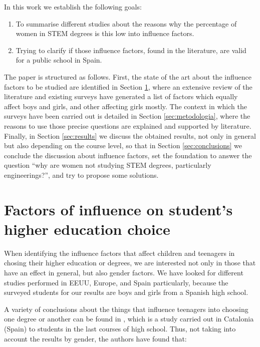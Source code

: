 \documentclass[journal,transmag]{IEEEtran}
\begin{document}
\begin{itemize}
\end{itemize}

In this work we establish the following goals:
\begin{enumerate}
	\item To summarise different studies about the reasons why the percentage of women in STEM degrees is this low into influence factors.
	\item Trying to clarify if those influence factors, found in the literature, are valid for a public school in Spain.
\end{enumerate}

The paper is structured as follows. First, the state of the art about the influence factors to be studied are identified in Section \ref{sec:factores}, where an extensive review of the literature and existing surveys have generated a list of factors which equally affect boys and girls, and other affecting girls mostly. The context in which the surveys have been carried out is detailed in Section \ref{sec:metodologia}, where the reasons to use those precise questions are explained and supported by literature. Finally, in Section \ref{sec:results} we discuss the obtained results, not only in general but also depending on the course level, so that in Section \ref{sec:conclusions} we conclude the discussion about influence factors, set the foundation to answer the question ``why are women not studying STEM degrees, particularly engineerings?'', and try to propose some solutions.

\section{Factors of influence on student's higher education choice}
\label{sec:factores}

When identifying the influence factors that affect children and teenagers in chosing their higher education or degrees, we are interested not only in those that have an effect in general, but also gender factors. We have looked for different studies performed in EEUU, Europe, and Spain particularly, because the surveyed students for our results are boys and girls from a Spanish high school.

A variety of conclusions about the things that influence teenagers into choosing one degree or another can be found in \cite{everis2012}, which is a study carried out in Catalonia (Spain) to students in the last courses of high school. Thus, not taking into account the results by gender, the authors have found that:
\end{document}

